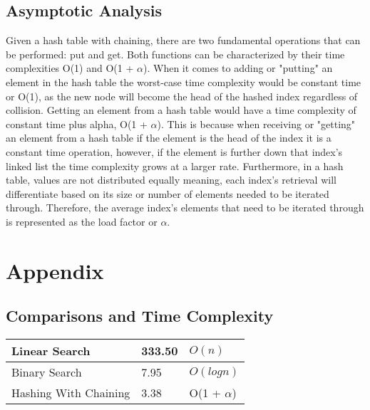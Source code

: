 \documentclass[letterpaper, 10pt,DIV=13]{scrartcl}
\numberwithin{equation}{section} %
\numberwithin{figure}{section} %
\numberwithin{table}{section} %
\begin{document}
\subsection{Asymptotic Analysis}
Given a hash table with chaining, there are two fundamental operations that can be performed: put and get. Both functions can be characterized by their time complexities O(1) and O(1 + $\alpha$). When it comes to adding or "putting" an element in the hash table the worst-case time complexity would be constant time or O(1), as the new node will become the head of the hashed index regardless of collision. Getting an element from a hash table would have a time complexity of constant time plus alpha, O(1 + $\alpha$). This is because when receiving or "getting" an element from a hash table if the element is the head of the index it is a constant time operation, however, if the element is further down that index's linked list the time complexity grows at a larger rate. Furthermore, in a hash table, values are not distributed equally meaning, each index's retrieval will differentiate based on its size or number of elements needed to be iterated through. Therefore, the average index's elements that need to be iterated through is represented as the load factor or $\alpha$.

\pagebreak


\section{Appendix}

\subsection{Comparisons and Time Complexity}
    \begin{center}
        \begin{tabular}{|l|l|l|}
            \hline
            Linear Search & 333.50 & $O(n)$  \\ \hline
            Binary Search & 7.95 & $O(logn)$ \\ \hline
            Hashing With Chaining     & 3.38 & O(1 + $\alpha$) \\ \hline
        \end{tabular}
    \end{center}
\end{document}
